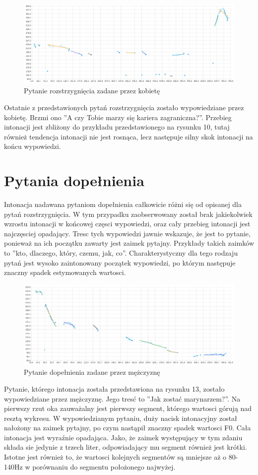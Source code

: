 \documentclass[a4paper,12 pt]{report}
\begin{document}
 \FloatBarrier
\begin{figure}[h]
\centering
\includegraphics[scale=0.65]{pytanie_rozstrzygniecia_3_kobieta.png}
\caption{Pytanie rozstrzygnięcia zadane przez kobietę}
\end{figure}
\FloatBarrier
Ostatnie z przedstawionych pytań rozstrzygnięcia zostało wypowiedziane przez kobietę. Brzmi ono ''A czy Tobie marzy się kariera zagraniczna?''.  Przebieg intonacji jest zbliżony do przykładu przedstawionego na rysunku 10, tutaj również tendencja intonacji nie jest rosnąca, lecz następuje silny skok intonacji na końcu wypowiedzi.
\section{Pytania dopełnienia}
Intonacja nadawana pytaniom dopełnienia całkowicie różni się od opisanej dla pytań rozstrzygnięcia. W tym przypadku zaobserwowany został brak jakiekolwiek wzrostu intonacji w końcowej częsci wypowiedzi, oraz cały przebieg intonacji jest najczęsciej opadający. Tresc tych wypowiedzi jawnie wskazuje, że jest to pytanie, ponieważ na ich początku zawarty jest zaimek pytajny. Przykłady takich zaimków to ''kto, dlaczego, który, czemu, jak, co''. Charakterystyczny dla tego rodzaju pytań jest wysoko zaintonowany początek wypowiedzi,  po którym następuje znaczny spadek estymowanych wartosci.
 \FloatBarrier
\begin{figure}[h]
\centering
\includegraphics[scale=0.55]{pytanie_uzupelnienia_marynarz.png}
\caption{Pytanie dopełnienia zadane przez mężczyznę}
\end{figure}
\FloatBarrier
Pytanie, którego intonacja została przedstawiona na rysunku 13, zostało wypowiedziane przez mężczyznę. Jego tresć to ''Jak zostać marynarzem?''. Na pierwszy rzut oka zauważalny jest pierwszy segment, którego wartosci górują nad resztą wykresu. W wypowiedzianym pytaniu, duży nacisk intonacyjny został nałożony na zaimek pytajny, po czym nastąpił znaczny spadek wartosci F0. Cała intonacja jest wyraźnie opadająca. Jako, że zaimek występujący w tym zdaniu składa sie jedynie z trzech liter, odpowiadający mu segment również jest krótki. Istotne jest również to, że wartosci kolejnych segmentów są mniejsze aż o 80-140Hz w porównaniu do segmentu położonego najwyżej.
\end{document}
